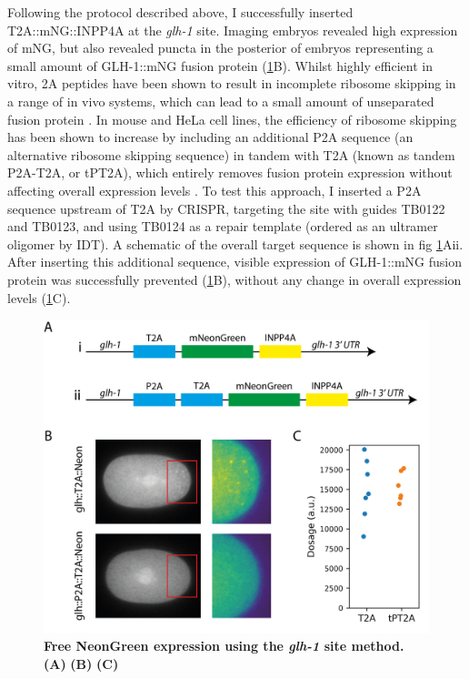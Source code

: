 \documentclass[12pt]{"report"}
\newcommand{\mycaption}[2]{\caption[#1]{\textbf{#1.} #2}}
\begin{document}
Following the protocol described above, I successfully inserted T2A::mNG::INPP4A at the \textit{glh-1} site. Imaging embryos revealed high expression of mNG, but also revealed puncta in the posterior of embryos representing a small amount of GLH-1::mNG fusion protein (\cref{fig:glh}B). Whilst highly efficient in vitro, 2A peptides have been shown to result in incomplete ribosome skipping in a range of in vivo systems, which can lead to a small amount of unseparated fusion protein \citep{Kim2011}. In mouse and HeLa cell lines, the efficiency of ribosome skipping has been shown to increase by including an additional P2A sequence (an alternative ribosome skipping sequence) in tandem with T2A (known as tandem P2A-T2A, or tPT2A), which entirely removes fusion protein expression without affecting overall expression levels \citep{Liu2017, Pan2017}. To test this approach, I inserted a P2A sequence upstream of T2A by CRISPR, targeting the site with guides TB0122 and TB0123, and using TB0124 as a repair template (ordered as an ultramer oligomer by IDT). A schematic of the overall target sequence is shown in fig \cref{fig:glh}Aii. After inserting this additional sequence, visible expression of GLH-1::mNG fusion protein was successfully prevented (\cref{fig:glh}B), without any change in overall expression levels (\cref{fig:glh}C).\\

\begin{figure}
\includegraphics[scale=1]{glh}
\centering
\mycaption{Free NeonGreen expression using the \textit{glh-1} site method}{
\textbf{(A)}
\textbf{(B)}
\textbf{(C)}
}
\label{fig:glh}
\end{figure}
\end{document}
